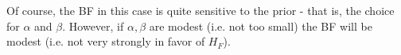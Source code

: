 \documentclass{article}[11pt]
\def\Hf{H_F}
\begin{document}
Of course, the BF in this case is quite sensitive to the prior - that is, the choice for $\alpha$ and $\beta$. 
However, if $\alpha,\beta$ are modest (i.e. not too small) the BF will be modest (i.e. not very strongly in favor of $\Hf$). 



\end{document}
